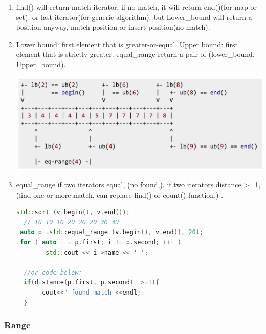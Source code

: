 \documentclass[a4paper,11pt,twoside]{book}
\begin{document}
\begin{itemize}
\begin{enumerate}
\item  find() will return match iterator, if no match, it will return end()(for map or set). or last iterator(for generic algorithm). but Lower\_bound  will return a position anyway, match position or insert position(no match).

\item Lower bound: first element that is greater-or-equal. Upper bound: first element that is strictly greater. equal\_range return a pair of (lower\_bound, Upper\_bound).

\includegraphics[scale=0.5]{pics/lowerupper.png}

\item equal\_range  if two iterators equal, (no found,). if two iterators distance >=1, (find one or more match, can replace find() or count() function.) .
\begin{lstlisting}[frame=single, language=c++]
  std::sort (v.begin(), v.end());
  // 10 10 10 20 20 20 30 30
 auto p =std::equal_range (v.begin(), v.end(), 20);
 for ( auto i = p.first; i != p.second; ++i )
        std::cout << i->name << ' ';

  //or code below:
  if(distance(p.first, p.second)  >=1){
       cout<<" found match"<<endl;
  }
\end{lstlisting}

\end{enumerate}
\end{itemize}


\subsubsection{Range}
\end{document}
